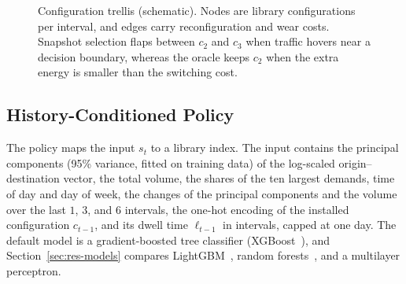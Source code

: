 \documentclass[preprint,12pt]{elsarticle}
\begin{document}
\begin{figure}[t]
\centering
{}
\caption{Configuration trellis (schematic). Nodes are library configurations per interval, and edges carry reconfiguration and wear costs. Snapshot selection flaps between $c_2$ and $c_3$ when traffic hovers near a decision boundary, whereas the oracle keeps $c_2$ when the extra energy is smaller than the switching cost.}
\label{fig:trellis}
\end{figure}

\subsection{History-Conditioned Policy}

The policy maps the input $s_t$ to a library index. The input contains the principal components (95\% variance, fitted on training data) of the log-scaled origin--destination vector, the total volume, the shares of the ten largest demands, time of day and day of week, the changes of the principal components and the volume over the last $1$, $3$, and $6$ intervals, the one-hot encoding of the installed configuration $c_{t-1}$, and its dwell time $\ell_{t-1}$ in intervals, capped at one day. The default model is a gradient-boosted tree classifier (XGBoost~\cite{chen2016xgboost}), and Section~\ref{sec:res-models} compares LightGBM~\cite{ke2017lightgbm}, random forests~\cite{breiman2001rf}, and a multilayer perceptron.
\end{document}
